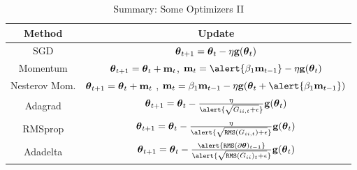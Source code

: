 \documentclass[xcolor=pdftex,dvipsnames,table,mathserif]{beamer}
\begin{document}
\begin{frame}
\begin{table}[htp]
\caption{Summary: Some Optimizers II}
\begin{center}
\begin{tabular}{|c|c|} \hline
Method & Update\\ \hline
SGD  & $\boldsymbol{\theta}_{t+1}= \boldsymbol{\theta}_{t}-\eta\mathbf{g}(\boldsymbol{\theta}_{t})$ \\ \hline
Momentum    & $\boldsymbol{\theta}_{t+1}= \boldsymbol{\theta}_{t}+\mathbf{m}_t$, $\mathbf{m}_{t}= \alert{\beta_1 \mathbf{m}_{t-1}} -\eta \mathbf{g}(\param_{t}) $ \\  \hline
Nesterov Mom.  &  $\boldsymbol{\theta}_{t+1}= \boldsymbol{\theta}_{t}+\mathbf{m}_t$ , $\mathbf{m}_t= \beta_1 \mathbf{m}_{t-1} -\eta\mathbf{g}(\param_{t}+ \alert{\beta_1 \mathbf{m}_{t-1}}) $\\ \hline
Adagrad & $\param_{t+1}= \param_{t}- \frac{\eta}{\alert{\sqrt { G_{ii,t}+\epsilon  }}} \mathbf{g}(\param_{t})$  \\ \hline
RMSprop & $\param_{t+1}= \param_{t}- \frac{\eta}{\alert{\sqrt { \texttt{RMS}(G_{ii,t})+\epsilon  }}} \mathbf{g}(\param_{t})$  \\ \hline
Adadelta & $ \param_{t+1}= \param_{t}- \frac{\alert{ \texttt{RMS}(\partial\param)_{t-1}}}{\alert{\sqrt { \texttt{RMS}(G_{ii})_{t}+\epsilon  }}} \mathbf{g}(\param_{t})$ \\ \hline
\end{tabular}
\end{center}
\label{default}
\end{table}%
\end{frame}
\end{document}
